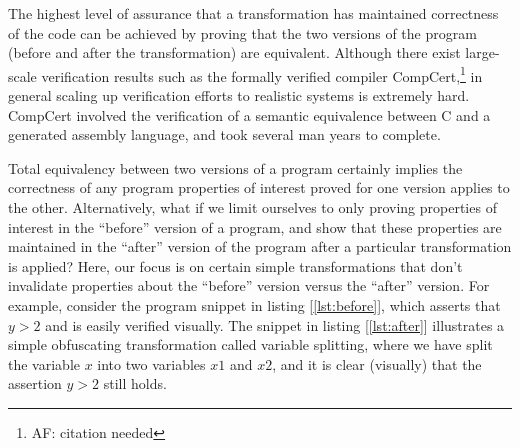 \documentclass[compsoc,conference,a4paper,10pt,times]{IEEEtran}
\begin{document}
The highest level of assurance that a transformation has maintained correctness of the code can be achieved by proving that the two versions of the program (before and after the transformation) are equivalent. Although there exist large-scale verification results such as the formally verified compiler CompCert,\footnote{AF: citation needed} in general scaling up verification efforts to realistic systems is extremely hard. CompCert involved the verification of a semantic equivalence between C and a generated assembly language, and took several man years to complete. 

Total equivalency between two versions of a program certainly implies the correctness of any program properties of interest proved for one version applies to the other.  Alternatively, what if we limit ourselves to only proving properties of interest in the ``before'' version of a program, and show that these properties are maintained in the ``after'' version of the program after a particular transformation is applied? 
%
Here, our focus is on certain simple transformations that don't invalidate properties about the ``before'' version versus the ``after'' version.  For example, consider the program snippet in listing [\ref{lst:before}], which asserts that $y > 2$ and is easily verified visually. The snippet in listing [\ref{lst:after}] illustrates a simple obfuscating transformation called variable splitting, where we have split the variable $x$ into two  variables $x1$ and $x2$, and it is clear (visually) that the assertion $y > 2$ still holds.
\end{document}
